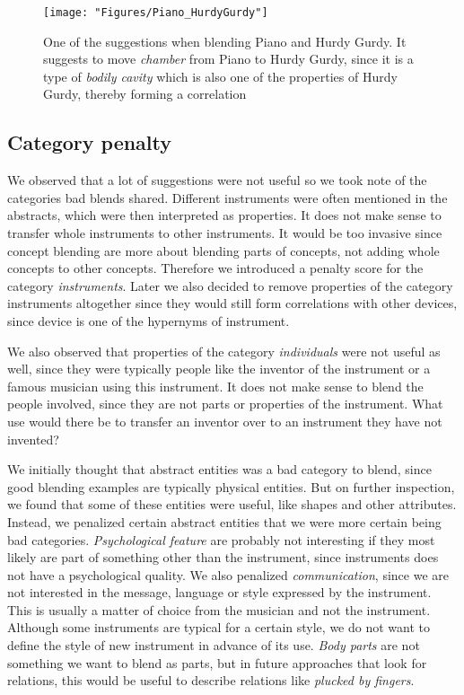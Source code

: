 \begin{figure}
	\centering
	\texttt{[image: "Figures/Piano\_HurdyGurdy"]}
	\caption{One of the suggestions when blending Piano and Hurdy Gurdy. It suggests to move \emph{chamber} from Piano to Hurdy Gurdy, since it is a type of \emph{bodily cavity} which is also one of the properties of Hurdy Gurdy, thereby forming a correlation }
	\label{fig:piano-hurdy-gurdy}
\end{figure}

\subsection{Category penalty}
We observed that a lot of suggestions were not useful so we took note of the categories bad blends shared. Different instruments were often mentioned in the abstracts, which were then interpreted as properties. It does not make sense to transfer whole instruments to other instruments. It would be too invasive since concept blending are more about blending parts of concepts, not adding whole concepts to other concepts. Therefore we introduced a penalty score for the category \emph{instruments}. Later we also decided to remove properties of the category instruments altogether since they would still form correlations with other devices, since device is one of the hypernyms of instrument.

We also observed that properties of the category \emph{individuals} were not useful as well, since they were typically people like the inventor of the instrument or a famous musician using this instrument. It does not make sense to blend the people involved, since they are not parts or properties of the instrument. What use would there be to transfer an inventor over to an instrument they have not invented?

We initially thought that abstract entities was a bad category to blend, since good blending examples are typically physical entities. But on further inspection, we found that some of these entities were useful, like shapes and other attributes. Instead, we penalized certain abstract entities that we were more certain being bad categories. \emph{Psychological feature} are probably not interesting if they most likely are part of something other than the instrument, since instruments does not have a psychological quality. We also penalized \emph{communication}, since we are not interested in the message, language or style expressed by the instrument. This is usually a matter of choice from the musician and not the instrument. Although some instruments are typical for a certain style, we do not want to define the style of new instrument in advance of its use. \emph{Body parts} are not something we want to blend as parts, but in future approaches that look for relations, this would be useful to describe relations like \emph{plucked by fingers}.

